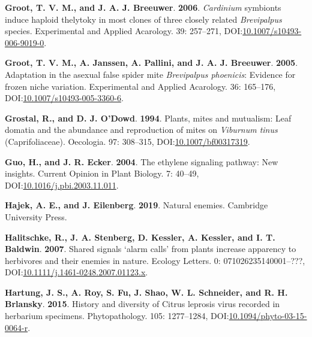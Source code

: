 \documentclass[12pt,final,CPage]{ufthesis}
\newlength{\cslhangindent}
\newenvironment{CSLReferences}[2] %
{%
	\setlength{\parindent}{0pt}
	\ifodd #1 \everypar{\setlength{\hangindent}{\cslhangindent}}\ignorespaces\fi
	\ifnum #2 > 0
	\setlength{\parskip}{#2\baselineskip}
	\fi
}%
{}
\begin{document}
{\begin{CSLReferences}{1}{0}
  \leavevmode{}%
  \textbf{Groot, T. V. M., and J. A. J. Breeuwer}. \textbf{2006}. \emph{Cardinium} symbionts induce haploid thelytoky in most clones of three closely related {\emph{Brevipalpus}} species. Experimental and Applied Acarology. 39: 257--271, DOI:\href{https://doi.org/10.1007/s10493-006-9019-0}{10.1007/s10493-006-9019-0}.

  \leavevmode{}%
  \textbf{Groot, T. V. M., A. Janssen, A. Pallini, and J. A. J. Breeuwer}. \textbf{2005}. Adaptation in the asexual false spider mite {\emph{Brevipalpus phoenicis}}: Evidence for frozen niche variation. Experimental and Applied Acarology. 36: 165--176, DOI:\href{https://doi.org/10.1007/s10493-005-3360-6}{10.1007/s10493-005-3360-6}.

  \leavevmode{}%
  \textbf{Grostal, R., and D. J. O'Dowd}. \textbf{1994}. Plants, mites and mutualism: Leaf domatia and the abundance and reproduction of mites on {\emph{Viburnum tinus}} ({Caprifoliaceae}). Oecologia. 97: 308--315, DOI:\href{https://doi.org/10.1007/bf00317319}{10.1007/bf00317319}.

  \leavevmode{}%
  \textbf{Guo, H., and J. R. Ecker}. \textbf{2004}. The ethylene signaling pathway: New insights. Current Opinion in Plant Biology. 7: 40--49, DOI:\href{https://doi.org/10.1016/j.pbi.2003.11.011}{10.1016/j.pbi.2003.11.011}.

  \leavevmode{}%
  \textbf{Hajek, A. E., and J. Eilenberg}. \textbf{2019}. Natural enemies. Cambridge University Press.

  \leavevmode{}%
  \textbf{Halitschke, R., J. A. Stenberg, D. Kessler, A. Kessler, and I. T. Baldwin}. \textbf{2007}. Shared signals {\textendash}{`alarm calls'} from plants increase apparency to herbivores and their enemies in nature. Ecology Letters. 0: 071026235140001--???, DOI:\href{https://doi.org/10.1111/j.1461-0248.2007.01123.x}{10.1111/j.1461-0248.2007.01123.x}.

  \leavevmode{}%
  \textbf{Hartung, J. S., A. Roy, S. Fu, J. Shao, W. L. Schneider, and R. H. Brlansky}. \textbf{2015}. History and diversity of {Citrus leprosis virus} recorded in herbarium specimens. Phytopathology{\textregistered}. 105: 1277--1284, DOI:\href{https://doi.org/10.1094/phyto-03-15-0064-r}{10.1094/phyto-03-15-0064-r}.


\end{CSLReferences}}
\end{document}
